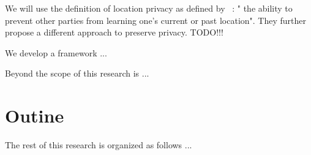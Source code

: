 We will use the definition of location privacy as defined by ~\parencite{location-privacy}: " the ability to prevent other parties from learning
one’s current or past location". They further propose a different approach to preserve privacy. TODO!!!

We develop a framework ... 

Beyond the scope of this research is ...

\section{Outine}

The rest of this research is organized as follows ...